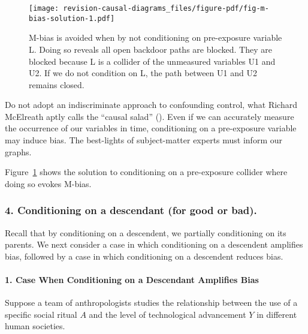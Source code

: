 \documentclass[
  singlecolumn,
  9pt]{article}
\let\oldparagraph\paragraph
\renewcommand{\paragraph}[1]{\oldparagraph{#1}\mbox{}}
\begin{document}
\begin{figure}

{\centering \texttt{[image: revision-causal-diagrams\_files/figure-pdf/fig-m-bias-solution-1.pdf]}

}

\caption{\label{fig-m-bias-solution}M-bias is avoided when by not
conditioning on pre-exposure variable L. Doing so reveals all open
backdoor paths are blocked. They are blocked because L is a collider of
the unmeasured variables U1 and U2. If we do not condition on L, the
path between U1 and U2 remains closed.}

\end{figure}

Do not adopt an indiscriminate approach to confounding control, what
Richard McElreath aptly calls the ``causal salad''
(). Even if we can
accurately measure the occurrence of our variables in time, conditioning
on a pre-exposure variable may induce bias. The best-lights of
subject-matter experts must inform our graphs.

Figure~\ref{fig-m-bias-solution} shows the solution to conditioning on a
pre-exposure collider where doing so evokes M-bias.

\subsubsection{4. Conditioning on a descendant (for good or
bad).}\label{conditioning-on-a-descendant-for-good-or-bad.}

Recall that by conditioning on a descendent, we partially conditioning
on its parents. We next consider a case in which conditioning on a
descendent amplifies bias, followed by a case in which conditioning on a
descendent reduces bias.

\paragraph{1. Case When Conditioning on a Descendant Amplifies
Bias}\label{case-when-conditioning-on-a-descendant-amplifies-bias}

Suppose a team of anthropologists studies the relationship between the
use of a specific social ritual \(A\) and the level of technological
advancement \(Y\) in different human societies.
\end{document}
